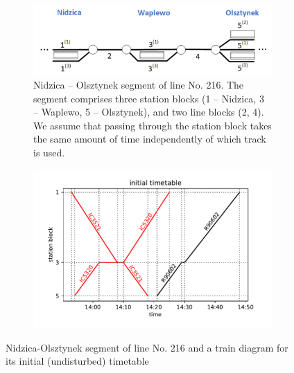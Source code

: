 \begin{figure}
  \begin{subfigure}{\textwidth}
    \includegraphics[width=\textwidth]{figures/line_small.pdf}
    \caption{Nidzica -- Olsztynek segment of line No. 216. The segment comprises
      three station blocks (1 -- Nidzica, 3 -- Waplewo, 5 -- Olsztynek), and two line blocks (2, 4).
      We assume that passing through the station block takes the same amount of time independently of
      which track is used.
    }
    \label{fig:linesmall}
  \end{subfigure}
  \begin{subfigure}{\textwidth}
    \includegraphics[width=\textwidth]{figures/train_diagram_small}
    \label{fig:diagramsmall}
  \end{subfigure}
  \caption{Nidzica-Olsztynek segment of line No. 216 and a train diagram for its initial (undisturbed) timetable}
\end{figure}


